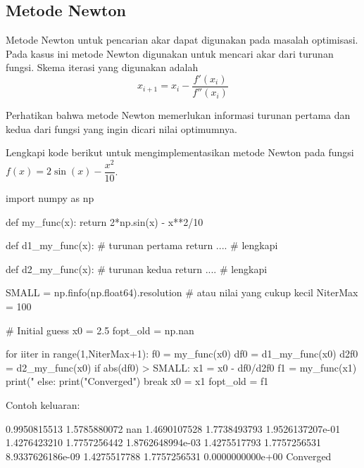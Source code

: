 \subsection{Metode Newton}

Metode Newton untuk pencarian akar dapat digunakan pada masalah optimisasi.
Pada kasus ini metode Newton digunakan untuk mencari akar dari turunan
fungsi. Skema iterasi yang digunakan adalah
\begin{equation}
x_{i+1} = x_{i} - \frac{f'(x_i)}{f''(x_i)}
\end{equation}

Perhatikan bahwa metode Newton memerlukan informasi turunan pertama dan kedua
dari fungsi yang ingin dicari nilai optimumnya.

\begin{soal}
Lengkapi kode berikut untuk mengimplementasikan metode Newton
pada fungsi $f(x) = 2\sin(x) - \dfrac{x^2}{10}$.
\end{soal}

\begin{pythoncode}
import numpy as np

def my_func(x):
    return 2*np.sin(x) - x**2/10

def d1_my_func(x): # turunan pertama
    return .... # lengkapi

def d2_my_func(x): # turunan kedua
    return .... # lengkapi

SMALL = np.finfo(np.float64).resolution # atau nilai yang cukup kecil
NiterMax = 100

# Initial guess
x0 = 2.5
fopt_old = np.nan

for iiter in range(1,NiterMax+1):
    f0 = my_func(x0)
    df0 = d1_my_func(x0)
    d2f0 = d2_my_func(x0)
    if abs(df0) > SMALL:
        x1 = x0 - df0/d2f0
        f1 = my_func(x1)
        print("%
    else:
        print("Converged")
        break
    x0 = x1
    fopt_old = f1
\end{pythoncode}

Contoh keluaran:
\begin{textcode}
      0.9950815513       1.5785880072                nan
      1.4690107528       1.7738493793   1.9526137207e-01
      1.4276423210       1.7757256442   1.8762648994e-03
      1.4275517793       1.7757256531   8.9337626186e-09
      1.4275517788       1.7757256531   0.0000000000e+00
Converged
\end{textcode}